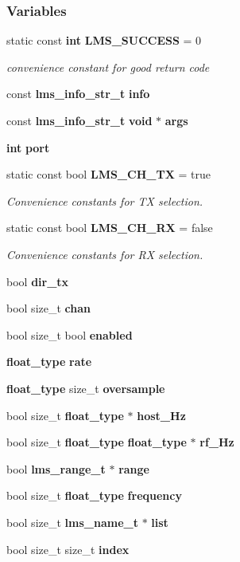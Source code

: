 \subsubsection*{Variables}
\begin{DoxyCompactItemize}
\item 
static const {\bf int} {\bf L\+M\+S\+\_\+\+S\+U\+C\+C\+E\+SS} = 0
\begin{DoxyCompactList}\small\item\em convenience constant for good return code \end{DoxyCompactList}\item 
const {\bf lms\+\_\+info\+\_\+str\+\_\+t} {\bf info}
\item 
const {\bf lms\+\_\+info\+\_\+str\+\_\+t} {\bf void} $\ast$ {\bf args}
\item 
{\bf int} {\bf port}
\item 
static const bool {\bf L\+M\+S\+\_\+\+C\+H\+\_\+\+TX} = true
\begin{DoxyCompactList}\small\item\em Convenience constants for TX selection. \end{DoxyCompactList}\item 
static const bool {\bf L\+M\+S\+\_\+\+C\+H\+\_\+\+RX} = false
\begin{DoxyCompactList}\small\item\em Convenience constants for RX selection. \end{DoxyCompactList}\item 
bool {\bf dir\+\_\+tx}
\item 
bool size\+\_\+t {\bf chan}
\item 
bool size\+\_\+t bool {\bf enabled}
\item 
{\bf float\+\_\+type} {\bf rate}
\item 
{\bf float\+\_\+type} size\+\_\+t {\bf oversample}
\item 
bool size\+\_\+t {\bf float\+\_\+type} $\ast$ {\bf host\+\_\+\+Hz}
\item 
bool size\+\_\+t {\bf float\+\_\+type} {\bf float\+\_\+type} $\ast$ {\bf rf\+\_\+\+Hz}
\item 
bool {\bf lms\+\_\+range\+\_\+t} $\ast$ {\bf range}
\item 
bool size\+\_\+t {\bf float\+\_\+type} {\bf frequency}
\item 
bool size\+\_\+t {\bf lms\+\_\+name\+\_\+t} $\ast$ {\bf list}
\item 
bool size\+\_\+t size\+\_\+t {\bf index}
\item 

\end{DoxyCompactItemize}
